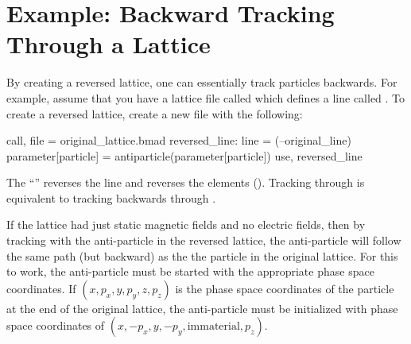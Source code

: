 \section{Example: Backward Tracking Through a Lattice}
\label{s:reverse}

By creating a reversed lattice, one can essentially track particles backwards. For example,
assume that you have a lattice file called  which defines a line
called . To create a reversed lattice, create a new file with the following:
\begin{example}
  call, file = original_lattice.bmad
  reversed_line: line = (--original_line)
  parameter[particle] = antiparticle(parameter[particle])
  use, reversed_line
\end{example}
The ``\vn{--}'' reverses the line and reverses the elements (). Tracking through
 is equivalent to tracking backwards through .  

If the  lattice had just static magnetic fields and no electric fields, then
by tracking with the anti-particle in the reversed lattice, the anti-particle will follow the same
path (but backward) as the the particle in the original lattice. For this to work, the anti-particle
must be started with the appropriate phase space coordinates. If $(x, p_x, y, p_y, z, p_z)$ is
the phase space coordinates of the particle at the end of the original lattice, the anti-particle
must be initialized with phase space coordinates of $(x, -p_x, y, -p_y, \text{immaterial}, p_z)$.
